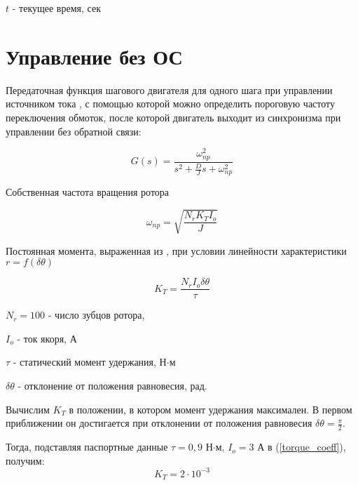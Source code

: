 $t$ - текущее время, сек

\newpage
\part{ Управление без ОС }

Передаточная функция шагового двигателя для одного шага при управлении источником тока \cite[гл. 4.2, ф-ла 4.65]{Kenio}, с помощью которой можно определить пороговую частоту переключения обмоток, после которой двигатель выходит из синхронизма при управлении без обратной связи:

\begin{equation}
    \label{step_motor_transfer_function}
    G(s) = \frac{\omega_{np}^{2}}{s^{2} + \frac{D}{J}s + \omega_{np}^{2} }
\end{equation}

Собственная частота вращения ротора \cite[гл. 4.2, ф-ла 4.48]{Kenio}

\begin{equation}
    \label{rotor_natural_frequency}
    \omega_{np} = \sqrt{\frac{N_{r}K_{T}I_{o}}{J}}
\end{equation}

Постоянная момента, выраженная из \cite[гл. 4.2, ф-ла 4.52]{Kenio}, при условии линейности характеристики $r = f(\delta\theta)$

\begin{equation}
    \label{torque_coeff}
    K_{T} = \frac{N_{r}I_{o}\delta\theta}{\tau}
\end{equation}

$N_{r} = 100$ - число зубцов ротора,

$I_{o}$ - ток якоря, А

$\tau$ - статический момент удержания, Н$\cdot$м

$\delta\theta$ - отклонение от положения равновесия, рад.
\newline\newline

Вычислим $K_{T}$ в положении, в котором момент удержания максимален. В первом приближении он достигается при отклонении от положения равновесия $\delta\theta = \frac{\pi}{2}$.

Тогда, подставляя паспортные данные $\tau = 0,9$ Н$\cdot$м, $I_{o} = 3$ А в (\ref{torque_coeff}), получим:
\begin{equation}
    \label{first_approximation_moment_coeff}
    K_{T} = 2\cdot10^{-3}
\end{equation}

